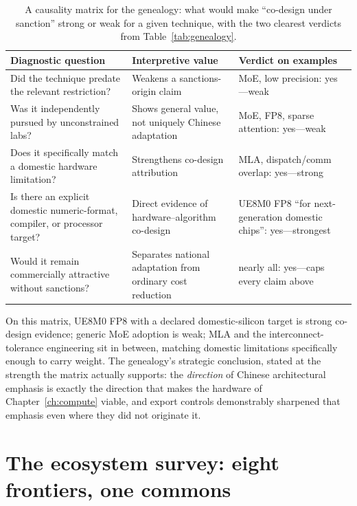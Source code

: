 \begin{table}[htbp]
  \centering
  \scriptsize
  \caption{A causality matrix for the genealogy: what would make ``co-design under sanction'' strong or weak for a given technique, with the two clearest verdicts from Table~\ref{tab:genealogy}.}
  \label{tab:causality}
  \begin{tabular}{p{56mm}p{42mm}p{34mm}}
    \toprule
    Diagnostic question & Interpretive value & Verdict on examples \\
    \midrule
    Did the technique predate the relevant restriction? & Weakens a sanctions-origin claim & MoE, low precision: yes---weak \\
    \addlinespace
    Was it independently pursued by unconstrained labs? & Shows general value, not uniquely Chinese adaptation & MoE, FP8, sparse attention: yes---weak \\
    \addlinespace
    Does it specifically match a domestic hardware limitation? & Strengthens co-design attribution & MLA, dispatch/comm overlap: yes---strong \\
    \addlinespace
    Is there an explicit domestic numeric-format, compiler, or processor target? & Direct evidence of hardware--algorithm co-design & UE8M0 FP8 ``for next-generation domestic chips'': yes---strongest \\
    \addlinespace
    Would it remain commercially attractive without sanctions? & Separates national adaptation from ordinary cost reduction & nearly all: yes---caps every claim above \\
    \bottomrule
  \end{tabular}
\end{table}

On this matrix, UE8M0 FP8 with a declared domestic-silicon target is strong co-design evidence; generic MoE adoption is weak; MLA and the interconnect-tolerance engineering sit in between, matching domestic limitations specifically enough to carry weight. The genealogy's strategic conclusion, stated at the strength the matrix actually supports: the \emph{direction} of Chinese architectural emphasis is exactly the direction that makes the hardware of Chapter~\ref{ch:compute} viable, and export controls demonstrably sharpened that emphasis even where they did not originate it.

\section{The ecosystem survey: eight frontiers, one commons}
\label{sec:model-survey}

